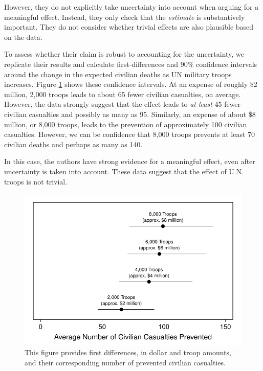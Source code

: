 \documentclass[12pt]{article}
\begin{document}
However, they do not explicitly take uncertainty into account when arguing for a meaningful effect. Instead, they only check that the \emph{estimate} is substantively important. They do not consider whether trivial effects are also plausible based on the data.

To assess whether their claim is robust to accounting for the uncertainty, we replicate their results and calculate first-differences and 90\% confidence intervals around the change in the expected civilian deaths as UN military troops increases. Figure \ref{fig:hks-ci} shows these confidence intervals. At an expense of roughly \$2 million, 2,000 troops leads to about 65 fewer civilian casualties, on average. However, the data strongly suggest that the effect leads to \textit{at least} 45 fewer civilian casualties and possibly as many as 95. Similarly, an expense of about \$8 million, or 8,000 troops, leads to the prevention of approximately 100 civilian casualties. However, we can be confidence that 8,000 troops prevents at least 70 civilian deaths and perhaps as many as 140. 

In this case, the authors have strong evidence for a meaningful effect, even after uncertainty is taken into account. These data suggest that the effect of U.N. troops is not trivial.

\begin{figure}[H]
\begin{center}
\includegraphics[scale = .8]{figs/hks-ci.pdf}
\caption{This figure provides first differences, in dollar and troop amounts, and their corresponding number of prevented civilian casualties.}\label{fig:hks-ci}
\end{center}
\end{figure}
\end{document}
